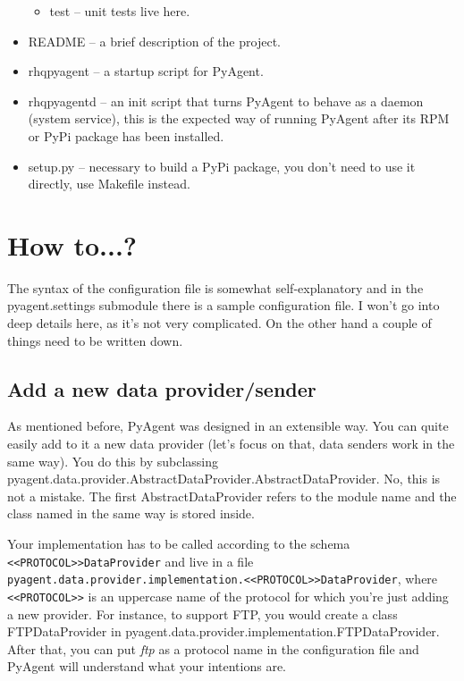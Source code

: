 \documentclass[a4paper,twoside,11pt]{article}
\begin{document}
\begin{itemize}
\begin{itemize}
\begin{itemize}
						\end{itemize}
					\item test -- unit tests live here.
				\end{itemize}
			\item README -- a brief description of the project.
			\item rhqpyagent -- a startup script for PyAgent.
			\item rhqpyagentd -- an init script that turns PyAgent to behave as a daemon (system service), this is the expected way of running PyAgent after its RPM or PyPi package has been installed.
			\item setup.py -- necessary to build a PyPi package, you don't need to use it directly, use Makefile instead.
		\end{itemize}

	\section{How to...?}
		The syntax of the configuration file is somewhat self-explanatory and in the pyagent.settings submodule there is a sample configuration file. I won't go into deep details here, as it's not very complicated. On the other hand a couple of things need to be written down.

		\subsection{Add a new data provider/sender}

			As mentioned before, PyAgent was designed in an extensible way. You can quite easily add to it a new data provider (let's focus on that, data senders work in the same way). You do this by subclassing pyagent.data.provider.AbstractDataProvider.AbstractDataProvider. No, this is not a  mistake. The first AbstractDataProvider refers to the module name and the class named in the same way is stored inside.

			Your implementation has to be called according to the schema \texttt{<<PROTOCOL>>DataProvider} and live in a file \texttt{pyagent.data.provider.implementation.<<PROTOCOL>>DataProvider}, where \texttt{<<PROTOCOL>>} is an uppercase name of the protocol for which you're just adding a new provider. For instance, to support FTP, you would create a class FTPDataProvider in pyagent.\-data.\-provider.\-implementation.\-FTPDataProvider. After that, you can put \emph{ftp} as a protocol name in the configuration file and PyAgent will understand what your intentions are.
\end{document}
